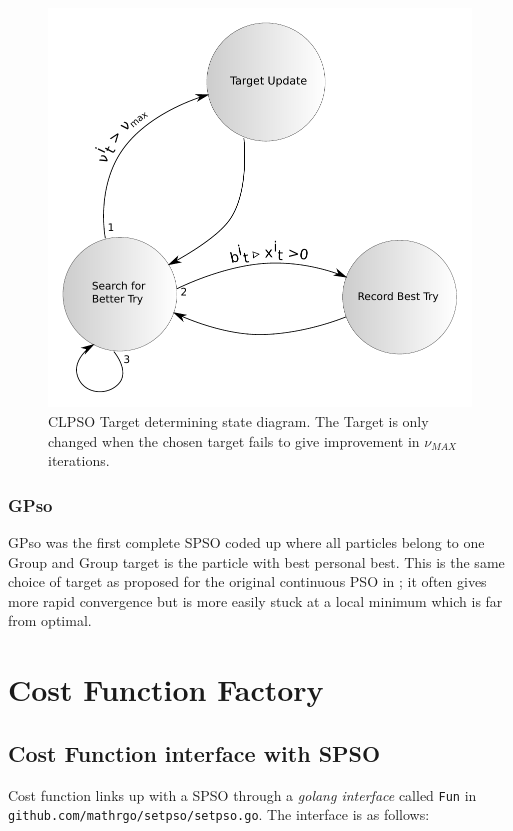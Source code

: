 \documentclass[a4paper,oneside,english]{book}
\numberwithin{equation}{section}
\numberwithin{figure}{section}
\newcommand{\codesorc}[1]{\texttt{github.com/mathrgo/setpso/#1}}
\begin{document}
\begin{figure}
	\centering
	\includegraphics[width=0.7\linewidth]{CLPSO.pdf}
	\caption[CLPSO State Diagram for Determining Target]{CLPSO Target determining state diagram. The Target is only changed when the chosen target fails to give improvement in $\nu_{MAX}$ iterations.}
	\label{fig:clpso}
\end{figure}

\subsection{GPso}
GPso was the first complete SPSO coded up where all particles belong to one Group and Group target is the particle with best personal best. This  is the same choice of target as proposed for the original continuous  PSO in \cite{KE-pso}; it often gives more rapid convergence but is more easily stuck at a local minimum which is far from optimal. 

\chapter{Cost Function Factory}
\section{Cost Function interface with SPSO}
Cost function links up with a SPSO through a \emph{golang interface }called \texttt{Fun}  in \codesorc{setpso.go}. The interface is as follows: 
\end{document}
